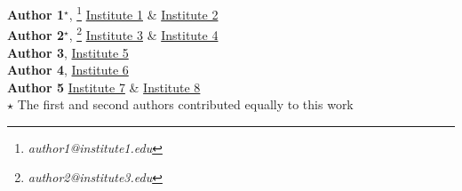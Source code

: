 \textbf{Author 1}$^\star$, \footnote{\textit{author1@institute1.edu}} \href{https://www.authorea.com/inst/}{Institute 1} \& \href{https://www.authorea.com/inst/}{Institute 2}\\ \textbf{Author 2}$^\star$, \footnote{\textit{author2@institute3.edu}} \href{https://www.authorea.com/inst/}{Institute 3} \& \href{https://www.authorea.com/inst/}{Institute 4} \\ \textbf{Author 3}, \href{https://www.authorea.com/inst/}{Institute 5}\\ \textbf{Author 4}, \href{https://www.authorea.com/inst/}{Institute 6} \\ \textbf{Author 5} \href{https://www.authorea.com/inst/}{Institute 7} \& \href{https://www.authorea.com/inst/}{Institute 8}\\ $\star$ The first and second authors contributed equally to this work

